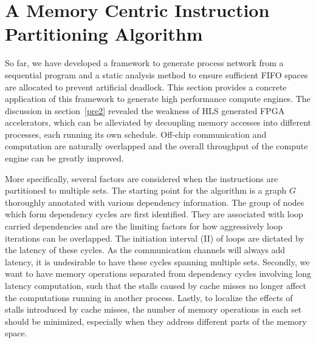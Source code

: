 \documentclass{sig-alternate}
\begin{document}
\section{A Memory Centric Instruction Partitioning Algorithm}
\label{exampleAlgo}
So far, we have developed a framework to generate process network from a sequential program and a static analysis method to ensure sufficient FIFO spaces are allocated to prevent artificial deadlock. This section provides a concrete application of this
framework to generate high performance compute engines. The discussion in section~\ref{pre2} revealed the weakness of HLS generated FPGA accelerators, which
can be
alleviated by decoupling memory accesses into different processes, each running its own schedule. Off-chip communication
and computation are naturally overlapped and the overall throughput of the compute
engine can be greatly improved.

More specifically, several factors are considered when the instructions are partitioned
to multiple sets. The starting point for the algorithm is a graph $G$ thoroughly annotated with various dependency information. The group of nodes which form dependency cycles are first identified. They are associated with loop carried dependencies and are the limiting factors for how aggressively loop iterations can be overlapped. The initiation
interval (II) of loops are dictated by the latency of these cycles.
As the communication channels will always add latency, it is undesirable to have
these cycles spanning multiple sets.
Secondly, we want to have memory operations separated from dependency cycles involving long latency computation, such that the stalls caused by cache misses no longer affect the computations running in another process. Lastly, to
localize the effects of stalls introduced by cache misses, the
number of memory operations in each set should be
minimized, especially when they address different parts of the
memory space.
\end{document}
